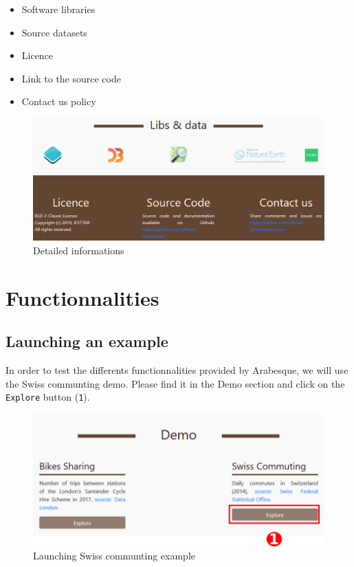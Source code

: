 \documentclass[]{book}
\providecommand{\tightlist}{%
  \setlength{\itemsep}{0pt}\setlength{\parskip}{0pt}}
\begin{document}
\begin{itemize}
\tightlist
\item
  Software libraries
\item
  Source datasets
\item
  Licence
\item
  Link to the source code
\item
  Contact us policy
\end{itemize}

\begin{figure}
\centering
\includegraphics{images/main/06_arabesque_detailed_infos.png}
\caption{Detailed informations}
\end{figure}

\hypertarget{functionnalities}{%
\chapter{Functionnalities}\label{functionnalities}}

\hypertarget{launching-an-example}{%
\section{Launching an example}\label{launching-an-example}}

In order to test the differents functionnalities provided by Arabesque, we will use the Swiss communting demo.
Please find it in the Demo section and click on the \texttt{Explore} button (\texttt{1}).

\begin{figure}
\centering
\includegraphics{images/functions/01_functions_launch_swiss_example.png}
\caption{Launching Swiss communting example}
\end{figure}
\end{document}
